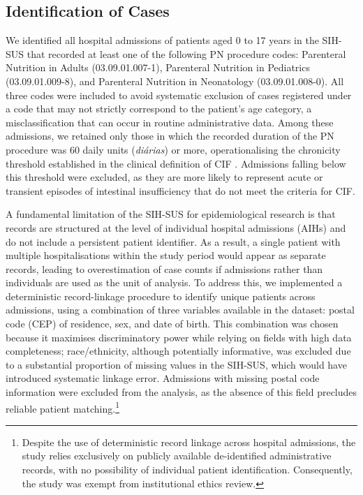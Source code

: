 \documentclass[pdflatex,sn-mathphys-num]{sn-jnl}
\theoremstyle{thmstyleone}%
\theoremstyle{thmstyletwo}%
\theoremstyle{thmstylethree}%
\begin{document}
\subsection*{Identification of Cases}

We identified all hospital admissions of patients aged 0 to 17 years in the SIH-SUS that recorded at least one of the following PN procedure codes: Parenteral Nutrition in Adults (03.09.01.007-1), Parenteral Nutrition in Pediatrics (03.09.01.009-8), and Parenteral Nutrition in Neonatology (03.09.01.008-0). All three codes were included to avoid systematic exclusion of cases registered under a code that may not strictly correspond to the patient's age category, a misclassification that can occur in routine administrative data. Among these admissions, we retained only those in which the recorded duration of the PN procedure was 60 daily units (\textit{di\'{a}rias}) or more, operationalising the chronicity threshold established in the clinical definition of CIF \cite{aspen2022pif}. Admissions falling below this threshold were excluded, as they are more likely to represent acute or transient episodes of intestinal insufficiency that do not meet the criteria for CIF.

A fundamental limitation of the SIH-SUS for epidemiological research is that records are structured at the level of individual hospital admissions (AIHs) and do not include a persistent patient identifier. As a result, a single patient with multiple hospitalisations within the study period would appear as separate records, leading to overestimation of case counts if admissions rather than individuals are used as the unit of analysis. To address this, we implemented a deterministic record-linkage procedure to identify unique patients across admissions, using a combination of three variables available in the dataset: postal code (CEP) of residence, sex, and date of birth. This combination was chosen because it maximises discriminatory power while relying on fields with high data completeness; race/ethnicity, although potentially informative, was excluded due to a substantial proportion of missing values in the SIH-SUS, which would have introduced systematic linkage error. Admissions with missing postal code information were excluded from the analysis, as the absence of this field precludes reliable patient matching.\footnote{Despite the use of deterministic record linkage across hospital admissions, the study relies exclusively on publicly available de-identified administrative records, with no possibility of individual patient identification. Consequently, the study was exempt from institutional ethics review.}
\end{document}
